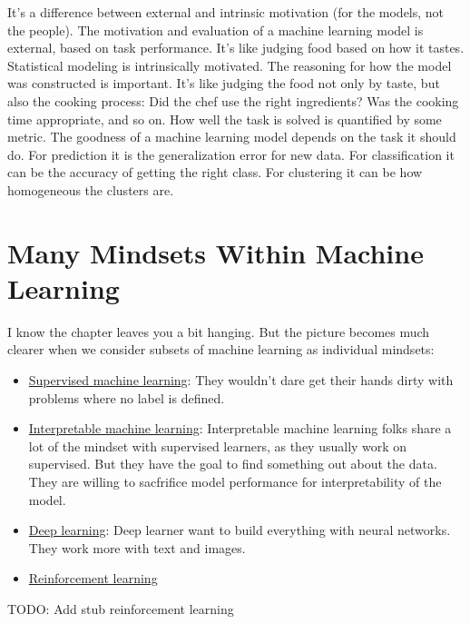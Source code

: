 \documentclass[
  10pt,
]{scrbook}
\providecommand{\tightlist}{%
  \setlength{\itemsep}{0pt}\setlength{\parskip}{0pt}}
\begin{document}
It's a difference between external and intrinsic motivation (for the models, not the people).
The motivation and evaluation of a machine learning model is external, based on task performance.
It's like judging food based on how it tastes.
Statistical modeling is intrinsically motivated.
The reasoning for how the model was constructed is important.
It's like judging the food not only by taste, but also the cooking process: Did the chef use the right ingredients? Was the cooking time appropriate, and so on.
How well the task is solved is quantified by some metric.
The goodness of a machine learning model depends on the task it should do.
For prediction it is the generalization error for new data.
For classification it can be the accuracy of getting the right class.
For clustering it can be how homogeneous the clusters are.

\hypertarget{many-mindsets-within-machine-learning}{%
\section{Many Mindsets Within Machine Learning}\label{many-mindsets-within-machine-learning}}

I know the chapter leaves you a bit hanging.
But the picture becomes much clearer when we consider subsets of machine learning as individual mindsets:

\begin{itemize}
\tightlist
\item
  \protect\hyperlink{supervised-ml}{Supervised machine learning}: They wouldn't dare get their hands dirty with problems where no label is defined.
\item
  \protect\hyperlink{interpretable-ml}{Interpretable machine learning}: Interpretable machine learning folks share a lot of the mindset with supervised learners, as they usually work on supervised. But they have the goal to find something out about the data. They are willing to sacfrifice model performance for interpretability of the model.
\item
  \protect\hyperlink{deep-learning}{Deep learning}: Deep learner want to build everything with neural networks. They work more with text and images.
\item
  \protect\hyperlink{reinforcement-learning}{Reinforcement learning}
\end{itemize}

TODO: Add stub reinforcement learning
\end{document}
